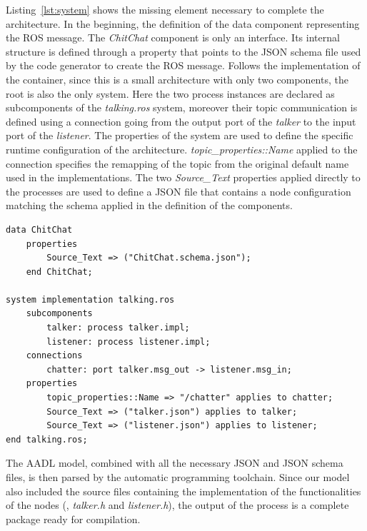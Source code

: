 Listing~\ref{lst:system} shows the missing element necessary to complete the architecture. In the beginning, the definition of the data component representing the ROS message. The \textit{ChitChat} component is only an interface. Its internal structure is defined through a property that points to the JSON schema file used by the code generator to create the ROS message. Follows the implementation of the container, since this is a small architecture with only two components, the root is also the only system. Here the two process instances are declared as subcomponents of the \textit{talking.ros} system, moreover their topic communication is defined using a connection going from the output port of the \textit{talker} to the input port of the \textit{listener}. The properties of the system are used to define the specific runtime configuration of the architecture. \textit{topic\_properties::Name} applied to the connection specifies the remapping of the topic from the original default name used in the implementations. The two \textit{Source\_Text} properties applied directly to the processes are used to define a JSON file that contains a node configuration matching the schema applied in the definition of the components. 

\begin{lstlisting}[language=AADL,caption={Message and system definition.},label=lst:system]
data ChitChat
	properties
		Source_Text => ("ChitChat.schema.json");
	end ChitChat;
	
system implementation talking.ros
	subcomponents
		talker: process talker.impl;
		listener: process listener.impl;
	connections
		chatter: port talker.msg_out -> listener.msg_in;
	properties
		topic_properties::Name => "/chatter" applies to chatter;
		Source_Text => ("talker.json") applies to talker;
		Source_Text => ("listener.json") applies to listener;
end talking.ros;
\end{lstlisting}

The AADL model, combined with all the necessary JSON and JSON schema files, is then parsed by the automatic programming toolchain. Since our model also included the source files containing the implementation of the functionalities of the nodes (\ie, \textit{talker.h} and \textit{listener.h}), the output of the process is a complete package ready for compilation. 

